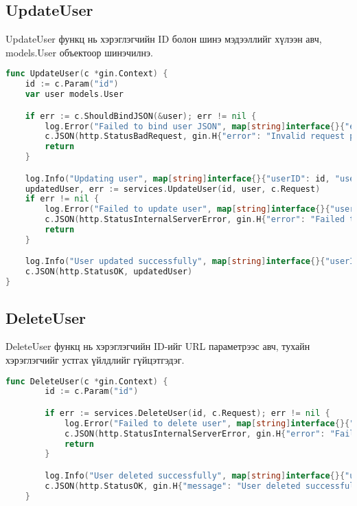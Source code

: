 \subsection{UpdateUser}
UpdateUser функц нь хэрэглэгчийн ID болон шинэ мэдээллийг хүлээн авч, models.User объектоор шинэчилнэ.
\begin{lstlisting}[language=Go, caption=UpdateUser Controller, frame=single]
	func UpdateUser(c *gin.Context) {
	id := c.Param("id")
	var user models.User

	if err := c.ShouldBindJSON(&user); err != nil {
		log.Error("Failed to bind user JSON", map[string]interface{}{"error": err.Error()}, c)
		c.JSON(http.StatusBadRequest, gin.H{"error": "Invalid request payload"})
		return
	}

	log.Info("Updating user", map[string]interface{}{"userID": id, "user": user}, c)
	updatedUser, err := services.UpdateUser(id, user, c.Request)
	if err != nil {
		log.Error("Failed to update user", map[string]interface{}{"userID": id, "error": err.Error()}, c)
		c.JSON(http.StatusInternalServerError, gin.H{"error": "Failed to update user"})
		return
	}

	log.Info("User updated successfully", map[string]interface{}{"userID": updatedUser.ID}, c)
	c.JSON(http.StatusOK, updatedUser)
}
\end{lstlisting}

\subsection{DeleteUser}
DeleteUser функц нь хэрэглэгчийн ID-ийг URL параметрээс авч, тухайн хэрэглэгчийг устгах үйлдлийг гүйцэтгэдэг.
\begin{lstlisting}[language=Go, caption=DeleteUser Controller, frame=single]
	func DeleteUser(c *gin.Context) {
		id := c.Param("id")

		if err := services.DeleteUser(id, c.Request); err != nil {
			log.Error("Failed to delete user", map[string]interface{}{"userID": id, "error": err.Error()}, c)
			c.JSON(http.StatusInternalServerError, gin.H{"error": "Failed to delete user"})
			return
		}

		log.Info("User deleted successfully", map[string]interface{}{"userID": id}, c)
		c.JSON(http.StatusOK, gin.H{"message": "User deleted successfully"})
	}
\end{lstlisting}

